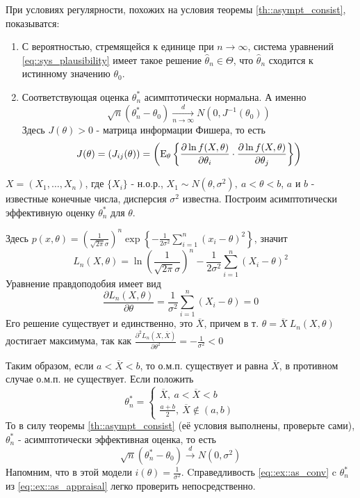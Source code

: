 При условиях регулярности, похожих на условия теоремы \ref{th::asympt_consist},
показыватся:
\begin{enumerate}
    \item С вероятностью, стремящейся к единице при \(n \rightarrow \infty\),
        система уравнений \eqref{eq::sys_plausibility} имеет такое решение \(\widehat{\theta}_n\in\Theta\),
        что \(\widehat{\theta}_n\) сходится к истинному значению \(\theta_0\).
    \item Соответствующая оценка \(\theta^*_n\) асимптотически нормальна. А именно
        \[\sqrt{n}(\theta^*_n - \theta_0) \xrightarrow[n\rightarrow\infty]{d} N(0, J^{-1}(\theta_0))\]
        Здесь \(J(\theta) > 0\) - матрица информации Фишера, то есть
        \[J(\theta) = (J_{ij}(\theta)) = \left(\mathrm{E}_\theta \left\{\frac{\partial \ln f(X, \theta)}{\partial\theta_i} \cdot \frac{\partial\ln f(X, \theta)}{\partial\theta_j}\right\}\right)\]
\end{enumerate}
\begin{example}
    \(X = (X_1, \ldots, X_n)\), где \(\{X_i\}\) - н.о.р., \(X_1 \sim N(\theta, \sigma^2),\ a < \theta < b\),
    \(a\) и \(b\) - известные конечные числа, дисперсия \(\sigma^2\) известна.
    Построим асимптотически эффективную оценку \(\theta^*_n\) для \(\theta\).

    Здесь \(p(x, \theta) = \left(\frac{1}{\sqrt{2\pi} \sigma}\right)^n\exp{\left\{-\frac{1}{2\sigma^2}\sum_{i=1}^n (x_i-\theta)^2\right\}}\),
    значит
    \[L_n(X, \theta) = \ln\left(\frac{1}{\sqrt{2\pi}\sigma}\right)^n - \frac{1}{2\sigma^2}\sum_{i=1}^n(X_i-\theta)^2\]
    Уравнение правдоподобия имеет вид
    \[\frac{\partial L_n(X, \theta)}{\partial\theta} = \frac{1}{\sigma^2}\sum_{i=1}^n(X_i - \theta) = 0\]
    Его решение существует и единственно, это \(\overline{X}\), причем
    в т. \(\theta = \overline{X}\ L_n(X,\theta)\) достигает максимума,
    так как \(\frac{\partial^2 L_n(X, \overline{X})}{\partial\theta^2} = - \frac{1}{\sigma^2} < 0\)

    Таким образом, если \(a < \overline{X} < b\), то о.м.п. существует и равна \(\overline{X}\),
    в противном случае о.м.п. не существует. Если положить
    \begin{equation}
        \label{eq::ex::as_appraisal}
        \theta^*_n = \begin{cases}
            \overline{X},\ a < \overline{X} < b \\
            \frac{a+b}{2},\ \overline{X} \notin (a,b)
        \end{cases}
    \end{equation}
    То в силу теоремы \ref{th::asympt_consist} (её условия
    выполнены, проверьте сами), \(\theta^*_n\) - асимптотически эффективная оценка, то есть
    \begin{equation}
        \label{eq::ex::as_conv}
        \sqrt{n}(\theta^*_n - \theta_0) \xrightarrow{d} N(0, \sigma^2)
    \end{equation}
    Напомним, что в этой модели \(i(\theta) = \frac{1}{\sigma^2}\).
    Cправедливость \eqref{eq::ex::as_conv} c \(\theta^*_n\)
    из \eqref{eq::ex::as_appraisal} легко проверить непосредственно.
\end{example}
